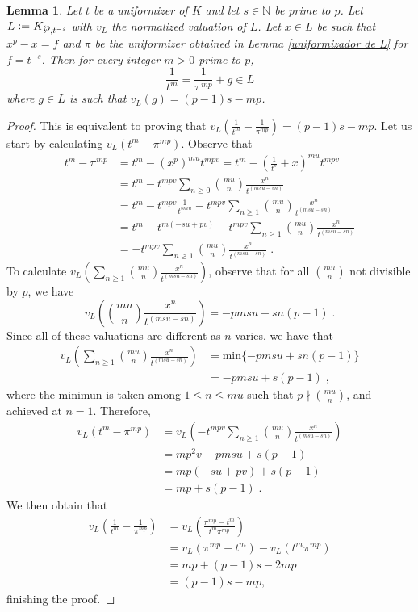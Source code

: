 \documentclass[a4paper,english,12pt]{amsart}
\newtheorem{lemma}[definition]{Lemma}
\numberwithin{equation}{section}
\newcommand{\defeq}{\vcentcolon=}
\renewcommand{\leq}{\leqslant}
\renewcommand{\geq}{\geqslant}
\renewcommand{\wp}{\ensuremath\raisebox{\depth}{$\mathchar"17D$}}
\renewcommand{\_}{\rule{0.25cm}{0.4pt}}
\begin{document}
\begin{lemma}\label{t em funcao de pi}
    Let $t$ be a uniformizer of $K$ and let $s\in \mathbb{N}$ be prime to $p$. Let $L\defeq K_{\wp, t^{-s}}$ with $v_{L}$ the normalized valuation of $L$. Let $x\in L$ be such that $x^{p}-x=f$ and $\pi$ be the uniformizer obtained in Lemma \ref{uniformizador de L} for $f=t^{-s}$. Then for every integer $m>0$ prime to $p$,
    \[
    \frac{1}{t^{m}}=\frac{1}{\pi^{mp}}+g\in L
    \]
    where $g\in L$ is such that $v_{L}(g)=(p-1)s-mp$.
\end{lemma}
\begin{proof}
    This is equivalent to proving that $v_{L}\left(\frac{1}{t^{m}}-\frac{1}{\pi^{mp}}\right)=(p-1)s-mp$.
    Let us start by calculating $v_{L}(t^{m}-\pi^{mp})$. Observe that
    \begin{align*}
        t^{m}-\pi^{mp} &=t^{m}-(x^{p})^{mu}t^{mpv}=t^{m}-\left(\frac{1}{t^{s}}+x\right)^{mu}t^{mpv}\;
        \\
        &=t^{m}-t^{mpv}\sum_{n\geq 0}\binom{mu}{n}\frac{x^{n}}{t^{(msu-sn)}}
        \\
        &=t^{m}-t^{mpv}\frac{1}{t^{smu}}-t^{mpv}\sum_{n\geq 1}\binom{mu}{n}\frac{x^{n}}{t^{(msu-sn)}}
        \\
        &=t^{m}-t^{m(-su+pv)}-t^{mpv}\sum_{n\geq 1}\binom{mu}{n}\frac{x^{n}}{t^{(msu-sn)}}
        \\
        &=-t^{mpv}\sum_{n\geq 1}\binom{mu}{n}\frac{x^{n}}{t^{(msu-sn)}}\;.
    \end{align*}
    To calculate $v_{L}(\sum_{n\geq 1}\binom{mu}{n}\frac{x^{n}}{t^{(msu-sn)}})$, observe that for all $\binom{mu}{n}$ not divisible by $p$, we have
    \[
    v_{L}\left(\binom{mu}{n}\frac{x^{n}}{t^{(msu-sn)}}\right)=-pmsu+sn(p-1)\;.
    \]
    Since all of these valuations are different as $n$ varies, we have that
    \begin{align*}
        v_{L}\left(\sum_{n\geq 1}\binom{mu}{n}\frac{x^{n}}{t^{(msu-sn)}}\right) &=\text{min}\{-pmsu+sn(p-1)\}
        \\
        &=-pmsu+s(p-1)\;,
    \end{align*}
    where the minimun is taken among $1\leq n\leq mu$ such that $p\nmid \binom{mu}{n}$, and achieved at $n=1$. Therefore, 
    \begin{align*}
        v_{L}(t^{m}-\pi^{mp}) &=v_{L}(-t^{mpv}\sum_{n\geq 1}\binom{mu}{n}\frac{x^{n}}{t^{(msu-sn)}})
        \\
        &=mp^{2}v-pmsu+s(p-1)
        \\
        &=mp(-su+pv)+s(p-1)
        \\
        &=mp+s(p-1)\;.
    \end{align*}
    We then obtain that
    \begin{align*}
        v_{L}\left(\frac{1}{t^{m}}-\frac{1}{\pi^{mp}}\right)&=v_{L}\left(\frac{\pi^{mp}-t^{m}}{t^{m}\pi^{mp}}\right)
        \\
        &=v_{L}(\pi^{mp}-t^{m})-v_{L}(t^{m}\pi^{mp})
        \\
        &=mp+(p-1)s-2mp
        \\
        &=(p-1)s-mp,
    \end{align*}
    finishing the proof.
\end{proof}
    
\end{document}
